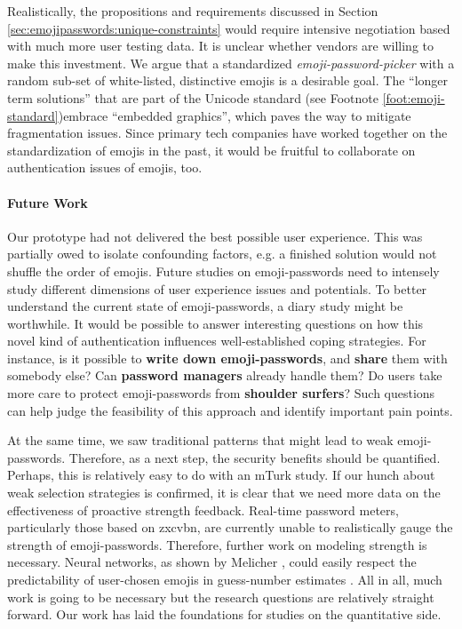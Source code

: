Realistically, the propositions and requirements discussed in Section \ref{sec:emojipasswords:unique-constraints} would require intensive negotiation based with much more user testing data.  It is unclear whether vendors are willing to make this investment. We argue that a standardized \textit{emoji-password-picker} with a random sub-set of white-listed, distinctive emojis is a desirable goal. The ``longer term solutions'' that are part of the Unicode standard (see Footnote \ref{foot:emoji-standard})embrace ``embedded graphics'', which paves the way to mitigate fragmentation issues. Since primary tech companies have worked together on the standardization of emojis in the past, it would be fruitful to collaborate on authentication issues of emojis, too.

\paragraph{Future Work}
Our prototype had not delivered the best possible user experience. This was partially owed to isolate confounding factors, e.g. a finished solution would not shuffle the order of emojis. Future studies on emoji-passwords need to intensely study different dimensions of user experience issues and potentials. To better understand the current state of emoji-passwords, a diary study might be worthwhile. It would be possible to answer interesting questions on how this novel kind of authentication influences well-established coping strategies. For instance, is it possible to \textbf{write down emoji-passwords}, and \textbf{share} them with somebody else? Can \textbf{password managers} already handle them?  Do users take more care to protect emoji-passwords from \textbf{shoulder surfers}? Such questions can help judge the feasibility of this approach and identify important pain points.

At the same time, we saw traditional patterns that might lead to weak emoji-passwords. Therefore, as a next step, the security benefits should be quantified. Perhaps, this is relatively easy to do with an \gls{mTurk} study. If our hunch about weak selection strategies is confirmed, it is clear that we need more data on the effectiveness of proactive strength feedback. Real-time password meters, particularly those based on zxcvbn, are currently unable to realistically gauge the strength of emoji-passwords. Therefore, further work on modeling strength is necessary. Neural networks, as shown by Melicher \etal, could easily respect the predictability of user-chosen emojis in guess-number estimates \cite{Melicher2016NeuralNetworks}. All in all, much work is going to be necessary but the research questions are relatively straight forward. Our work has laid the foundations for studies on the quantitative side. 

